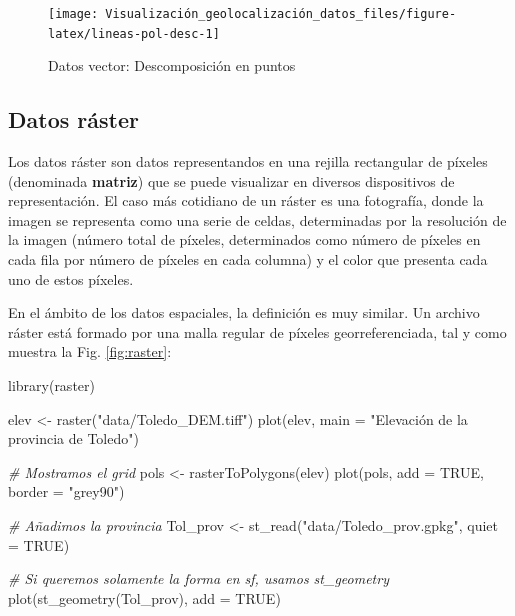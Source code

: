\documentclass[
]{book}
\newenvironment{Shaded}{\begin{snugshade}}{\end{snugshade}}
\newcommand{\AttributeTok}[1]{\textcolor[rgb]{0.77,0.63,0.00}{#1}}
\newcommand{\CommentTok}[1]{\textcolor[rgb]{0.56,0.35,0.01}{\textit{#1}}}
\newcommand{\ConstantTok}[1]{\textcolor[rgb]{0.00,0.00,0.00}{#1}}
\newcommand{\FunctionTok}[1]{\textcolor[rgb]{0.00,0.00,0.00}{#1}}
\newcommand{\NormalTok}[1]{#1}
\newcommand{\OtherTok}[1]{\textcolor[rgb]{0.56,0.35,0.01}{#1}}
\newcommand{\StringTok}[1]{\textcolor[rgb]{0.31,0.60,0.02}{#1}}
\theoremstyle{definition}
\theoremstyle{definition}
\theoremstyle{definition}
\theoremstyle{definition}
\theoremstyle{remark}
\begin{document}
\begin{figure}

{\centering \texttt{[image: Visualización\_geolocalización\_datos\_files/figure-latex/lineas-pol-desc-1]} 

}

\caption{Datos vector: Descomposición en puntos}\label{fig:lineas-pol-desc}
\end{figure}

\hypertarget{raster}{%
\subsection{Datos ráster}\label{raster}}

Los datos ráster son datos representandos en una rejilla rectangular de píxeles
(denominada \textbf{matriz}) que se puede visualizar en diversos dispositivos de
representación. El caso más cotidiano de un ráster es una fotografía, donde la
imagen se representa como una serie de celdas, determinadas por la resolución de
la imagen (número total de píxeles, determinados como número de píxeles en cada
fila por número de píxeles en cada columna) y el color que presenta cada uno de
estos píxeles.

En el ámbito de los datos espaciales, la definición es muy similar. Un archivo
ráster está formado por una malla regular de píxeles georreferenciada, tal y
como muestra la Fig. \ref{fig:raster}:

\begin{Shaded}
\begin{Highlighting}[]

\FunctionTok{library}\NormalTok{(raster)}

\NormalTok{elev }\OtherTok{\textless{}{-}} \FunctionTok{raster}\NormalTok{(}\StringTok{"data/Toledo\_DEM.tiff"}\NormalTok{)}
\FunctionTok{plot}\NormalTok{(elev, }\AttributeTok{main =} \StringTok{"Elevación de la provincia de Toledo"}\NormalTok{)}

\CommentTok{\# Mostramos el grid}
\NormalTok{pols }\OtherTok{\textless{}{-}} \FunctionTok{rasterToPolygons}\NormalTok{(elev)}
\FunctionTok{plot}\NormalTok{(pols, }\AttributeTok{add =} \ConstantTok{TRUE}\NormalTok{, }\AttributeTok{border =} \StringTok{"grey90"}\NormalTok{)}

\CommentTok{\# Añadimos la provincia}
\NormalTok{Tol\_prov }\OtherTok{\textless{}{-}} \FunctionTok{st\_read}\NormalTok{(}\StringTok{"data/Toledo\_prov.gpkg"}\NormalTok{, }\AttributeTok{quiet =} \ConstantTok{TRUE}\NormalTok{)}

\CommentTok{\# Si queremos solamente la forma en sf, usamos st\_geometry}
\FunctionTok{plot}\NormalTok{(}\FunctionTok{st\_geometry}\NormalTok{(Tol\_prov), }\AttributeTok{add =} \ConstantTok{TRUE}\NormalTok{)}
\end{Highlighting}
\end{Shaded}
\end{document}
